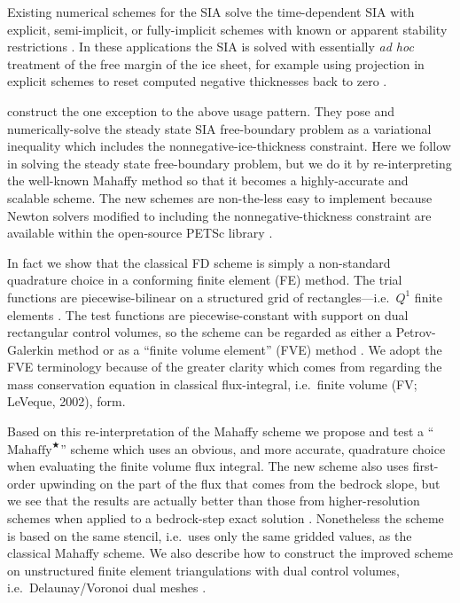 \documentclass[twocolumn,letterpaper]{igs}
\newcommand{\Mstar}{$\text{Mahaffy}^{\bigstar}$\xspace}
\begin{document}
Existing numerical schemes for the SIA solve the time-dependent SIA with explicit, semi-implicit, or fully-implicit schemes with known or apparent stability restrictions \citep[among others]{Bueleretal2005,EgholmNielsen2010,HindmarshPayne1996,Huybrechtsetal1996,
JaroschSchoofAnslow2013}.  In these applications the SIA is solved with essentially \emph{ad hoc} treatment of the free margin of the ice sheet, for example using projection in explicit schemes to reset computed negative thicknesses back to zero \citep{Bueleretal2005,JaroschSchoofAnslow2013}.

\cite{JouvetBueler2012} construct the one exception to the above usage pattern.  They pose and numerically-solve the steady state SIA free-boundary problem as a variational inequality \citep{KinderlehrerStampacchia} which includes the nonnegative-ice-thickness constraint.  Here we follow \cite{JouvetBueler2012} in solving the steady state free-boundary problem, but we do it by re-interpreting the well-known Mahaffy method so that it becomes a highly-accurate and scalable scheme.  The new schemes are non-the-less easy to implement because Newton solvers modified to including the nonnegative-thickness constraint \citep{BensonMunson2006} are available within the open-source PETSc library \citep{Balayetal2014}.

In fact we show that the classical \cite{Mahaffy1976} FD scheme is simply a non-standard quadrature choice in a conforming finite element (FE) method.  The trial functions are piecewise-bilinear on a structured grid of rectangles---i.e.~$Q^1$ finite elements \citep{Elmanetal2005}.  The test functions are piecewise-constant with support on dual rectangular control volumes, so the scheme can be regarded as either a Petrov-Galerkin method \citep{Elmanetal2005} or as a ``finite volume element'' (FVE) method \citep{Cai1990,EwingLinLin2002}.  We adopt the FVE terminology because of the greater clarity which comes from regarding the mass conservation equation in classical flux-integral, i.e.~finite volume (FV; LeVeque, 2002),\nocite{LeVeque} form.

Based on this re-interpretation of the Mahaffy scheme we propose and test a ``\Mstar'' scheme which uses an obvious, and more accurate, quadrature choice when evaluating the finite volume flux integral.  The new scheme also uses first-order upwinding on the part of the flux that comes from the bedrock slope, but we see that the results are actually better than those from higher-resolution schemes when applied to a bedrock-step exact solution \citep{JaroschSchoofAnslow2013}.  Nonetheless the scheme is based on the same stencil, i.e.~uses only the same gridded values, as the classical Mahaffy scheme.  We also describe how to construct the improved scheme on unstructured finite element triangulations with dual control volumes, i.e.~Delaunay/Voronoi dual meshes \citep{EgholmNielsen2010,Ringleretal2013}.
\end{document}
